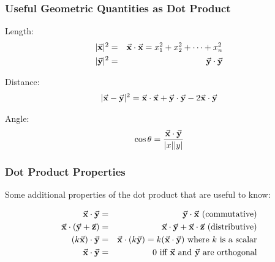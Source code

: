 \documentclass{beamer}
\begin{document}
\begin{frame}
  \frametitle{Useful Geometric Quantities as Dot Product}


Length:
\begin{eqnarray*}
|\vec{\mathbf{x}}|^2 & = & \vec{\mathbf{x}} \cdot \vec{\mathbf{x}}  =  x_1^2 + x_2^2 + \cdots + x_n^2\\
|\vec{\mathbf{y}}|^2 & = & \vec{\mathbf{y}} \cdot \vec{\mathbf{y}}
\end{eqnarray*}

Distance:
\begin{eqnarray*}
|\vec{\mathbf{x}}-\vec{\mathbf{y}}|^2 = \vec{\mathbf{x}} \cdot \vec{\mathbf{x}} + \vec{\mathbf{y}} \cdot \vec{\mathbf{y}} - 2 \vec{\mathbf{x}} \cdot \vec{\mathbf{y}}
\end{eqnarray*}

Angle:
\begin{eqnarray*}
\cos \theta = \frac{\vec{\mathbf{x}} \cdot \vec{\mathbf{y}}}{|x||y|}
\end{eqnarray*}

\begin{center}


\end{center}

\end{frame}

\begin{frame}
  \frametitle{Dot Product Properties}

Some additional properties of the dot product that are useful to know:

\begin{eqnarray*}
\bvec{x} \cdot \bvec{y} & = & \bvec{y} \cdot \bvec{x} \ \mbox{(commutative)} \\
\bvec{x} \cdot (\bvec{y} + \bvec{z}) & = & \bvec{x} \cdot \bvec{y} + \bvec{x} \cdot \bvec{z} \ \mbox{(distributive)}\\
(k\bvec{x}) \cdot \bvec{y} & = & \bvec{x} \cdot (k\bvec{y}) = k(\bvec{x} \cdot \bvec{y}) \ \mbox{where $k$ is a scalar} \\
\bvec{x} \cdot \bvec{y} & = & 0 \ \mbox{iff $\bvec{x}$ and $\bvec{y}$ are orthogonal}
\end{eqnarray*}

\end{frame}
\end{document}
